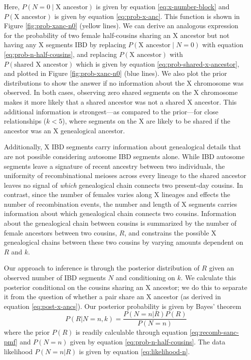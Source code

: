 \documentclass[9pt,twocolumn,twoside]{gsajnl}
\begin{document}
Here, $P(N = 0  \;|\; \text{X ancestor})$ is given by equation
\eqref{eq:x-number-block} and $P(\text{X ancestor})$ is given by equation
\eqref{eq:prob-x-anc}. This function is shown in Figure \ref{fig:prob-xanc-n0}
(yellow lines). We can derive an analogous expression for the probability of
two female half-cousins sharing an X ancestor but not having any X segments IBD
by replacing $P(\text{X ancestor} \;|\; N = 0)$ with equation
\eqref{eq:prob-n-half-cousins}, and replacing $P(\text{X ancestor})$ with
$P(\text{shared X ancestor})$ which is given by equation
\eqref{eq:prob-shared-x-ancestor}, and plotted in Figure \ref{fig:prob-xanc-n0}
(blue lines). We also plot the prior distributions to show the answer if no
information about the X chromosome was observed. In both cases, observing zero
shared segments on the X chromosome makes it more likely that a shared ancestor
was not a shared X ancestor. This additional information is strongest---as
compared to the prior---for close relationships ($k<5$), where segments on the
X are likely to be shared if the ancestor was an X genealogical ancestor. 

Additionally, X IBD segments carry information about genealogical details that
are not possible considering autosome IBD segments alone. While IBD autosome
segments leave a signature of recent ancestry between two individuals, the
uniformity of recombinational meioses across every lineage to the shared
ancestor leaves no signal of \emph{which} genealogical chain connects two
present-day cousins. In contrast, since the number of females varies along X
lineages and effects the number of recombination events, the number and length
of X segments carries information about which genealogical chain connects two
cousins. Information about the genealogical chain between cousins is summarized
by the number of female ancestors between two cousins, $R$, and constrains the
possible X genealogical chains between these two cousins by varying amounts
dependent on $R$ and $k$.

Our approach to inference is through the posterior distribution of $R$ given an
observed number of IBD segments $N$ and conditioning on $k$. We calculate this
posterior conditional on the cousins sharing an X ancestor; we do this to
separate it from the question of whether a pair share an X ancestor (as derived
in equation \eqref{eq:post-x-ancs}). Our posterior probability is given by
Bayes' theorem
%
\begin{equation}
  P(R | N = n, k) = \frac{P(N = n | R) P(R)}{P(N=n)}
\end{equation}
%
where the prior $P(R)$ is readily calculable through equation
\eqref{eq:recomb-sanc-pmf} and $P(N=n)$ given by equation
\eqref{eq:prob-n-half-cousins}. The data likelihood $P(N = n | R)$ is given by
equation \eqref{eq:likelihood-n}.
\end{document}
